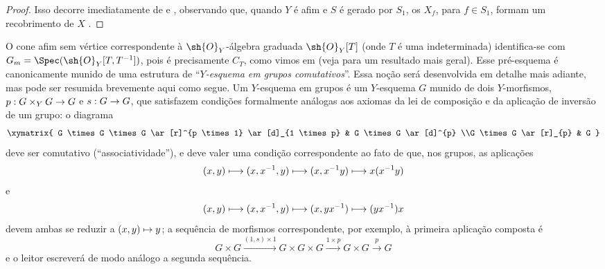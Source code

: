 \documentclass[oneside,10pt]{amsart}
\makeatletter
\newcommand{\ega@arrow}[2]{\mathchoice{#1}{#2}{#2}{#2}}
\let\ega@shortmapsto\mapsto
\renewcommand{\to}{\ega@arrow{\longrightarrow}{\rightarrow}}
\renewcommand{\mapsto}{\ega@arrow{\longmapsto}{\ega@shortmapsto}}
\let\EGAOriginalLabel\label
\renewcommand{\label}[1]{\phantomsection\EGAOriginalLabel{#1}}
\makeatother
\begin{document}
\begin{proof}
Isso decorre imediatamente de  e , observando que, quando $Y$ é afim e $S$ é gerado por $S_1$, os $X_f$, para $f\in S_1$, formam um recobrimento de $X$ .
\end{proof}
\begin{remark}[8.3.9]
\label{II.8.3.9}
O cone afim sem vértice correspondente à $\sh{O}_Y$-álgebra graduada $\sh{O}_Y[T]$ (onde $T$ é uma indeterminada) identifica-se com $G_m=\Spec(\sh{O}_Y[T,T^{-1}])$, pois é precisamente $C_T$, como vimos em  (veja  para um resultado mais geral).
Esse pré-esquema é canonicamente munido de uma estrutura de \textquotedblleft\emph{$Y$-esquema em grupos comutativos}\textquotedblright.
Essa noção será desenvolvida em detalhe mais adiante, mas pode ser resumida brevemente aqui como segue.
Um $Y$-esquema em grupos é um $Y$-esquema $G$ munido de dois $Y$-morfismos, $p:G\times_Y G\to G$ e $s:G\to G$, que satisfazem condições formalmente análogas aos axiomas da lei de composição e da aplicação de inversão de um grupo: o diagrama
\[
  \xymatrix{
    G \times G \times G
      \ar[r]^{p \times 1}
      \ar[d]_{1 \times p}
  & G \times G
      \ar[d]^{p}
  \\G \times G
      \ar[r]_{p}
  & G
  }
\]
deve ser comutativo (\textquotedblleft associatividade\textquotedblright), e deve valer uma condição correspondente ao fato de que, nos grupos, as aplicações
\[
  (x,y)
  \mapsto
  (x,x^{-1},y)
  \mapsto
  (x,x^{-1}y)
  \mapsto
  x(x^{-1}y)
\]
e
\[
  (x,y)
  \mapsto
  (x,x^{-1},y)
  \mapsto
  (x,yx^{-1})
  \mapsto
  (yx^{-1})x
\]
devem ambas se reduzir a $(x,y)\mapsto y$;
a sequência de morfismos correspondente, por exemplo, à primeira aplicação composta é
\[
  G \times G
  \xrightarrow{(1,s) \times 1}
  G \times G \times G
  \xrightarrow{1 \times p}
  G\times G
  \xrightarrow{p}
  G
\]
e o leitor escreverá de modo análogo a segunda sequência.


\end{remark}
\end{document}
